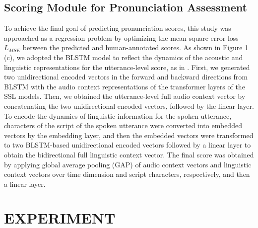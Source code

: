 \documentclass[a4paper]{article}
\begin{document}
\subsection{Scoring Module for Pronunciation Assessment}
To achieve the final goal of predicting pronunciation scores, this study was approached as a regression problem by optimizing the mean square error loss $L_{MSE}$ between the predicted and human-annotated scores. As shown in Figure 1 (c), we adopted the BLSTM model to reflect the dynamics of the acoustic and linguistic representations for the utterance-level score, as in \cite{yu2015using}\cite{chen2018end}. First, we generated two unidirectional encoded vectors in the forward and backward directions from BLSTM with the audio context representations of the transformer layers of the SSL models. Then, we obtained the utterance-level full audio context vector by concatenating the two unidirectional encoded vectors, followed by the linear layer. To encode the dynamics of linguistic information for the spoken utterance, characters of the script of the spoken utterance were converted into embedded vectors by the embedding layer, and then the embedded vectors were transformed to two BLSTM-based unidirectional encoded vectors followed by a linear layer to obtain the bidirectional full linguistic context vector. The final score was obtained by applying global average pooling (GAP) of audio context vectors and linguistic context vectors over time dimension and script characters, respectively, and then a linear layer. 




\section{EXPERIMENT}
\label{sec:pagestyle}
\end{document}
